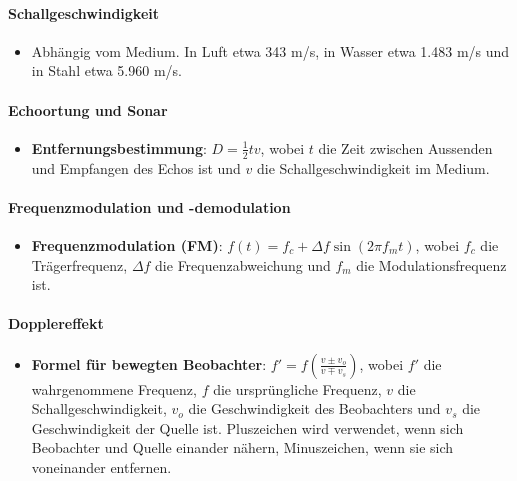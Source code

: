 \documentclass{vorlage-design-main}
\begin{document}
\hypertarget{schallgeschwindigkeit-1}{%
\paragraph{Schallgeschwindigkeit}\label{schallgeschwindigkeit-1}}

\begin{itemize}

\item
  Abhängig vom Medium. In Luft etwa 343 m/s, in Wasser etwa 1.483 m/s
  und in Stahl etwa 5.960 m/s.
\end{itemize}

\hypertarget{echoortung-und-sonar-1}{%
\paragraph{Echoortung und Sonar}\label{echoortung-und-sonar-1}}

\begin{itemize}

\item
  \textbf{Entfernungsbestimmung}: $D = \frac{1}{2} t v$, wobei $t$
  die Zeit zwischen Aussenden und Empfangen des Echos ist und $v$ die
  Schallgeschwindigkeit im Medium.
\end{itemize}

\hypertarget{frequenzmodulation-und--demodulation-1}{%
\paragraph{Frequenzmodulation und
-demodulation}\label{frequenzmodulation-und--demodulation-1}}

\begin{itemize}

\item
  \textbf{Frequenzmodulation (FM)}:
  $f(t) = f_c + \Delta f \sin(2 \pi f_m t)$, wobei $f_c$ die
  Trägerfrequenz, $\Delta f$ die Frequenzabweichung und $f_m$ die
  Modulationsfrequenz ist.
\end{itemize}

\hypertarget{dopplereffekt-1}{%
\paragraph{Dopplereffekt}\label{dopplereffekt-1}}

\begin{itemize}

\item
  \textbf{Formel für bewegten Beobachter}:
  $f' = f \left(\frac{v \pm v_o}{v \mp v_s}\right)$, wobei $f'$ die
  wahrgenommene Frequenz, $f$ die ursprüngliche Frequenz, $v$ die
  Schallgeschwindigkeit, $v_o$ die Geschwindigkeit des Beobachters und
  $v_s$ die Geschwindigkeit der Quelle ist. Pluszeichen wird
  verwendet, wenn sich Beobachter und Quelle einander nähern,
  Minuszeichen, wenn sie sich voneinander entfernen.
\end{itemize}
\end{document}
